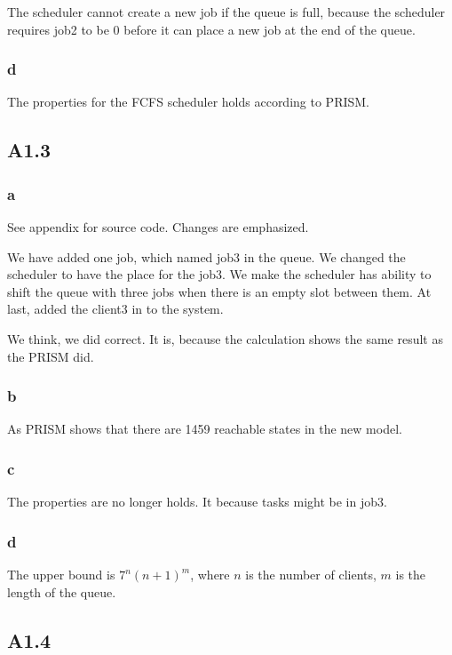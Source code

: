 The scheduler cannot create a new job if the queue is full, because the scheduler
requires job2 to be 0 before it can place a new job at the end of the queue.

\subsubsection{d}

The properties for the FCFS scheduler holds according to PRISM.

\subsection{A1.3}

\subsubsection{a}

See appendix for source code. Changes are emphasized.

We have added one job, which named job3 in the queue.
We changed the scheduler to have the place for the job3. We
make the scheduler has ability to shift the queue with three
jobs when there is an empty slot between them. At last, added
the client3 in to the system.

We think, we did correct. It is, because the calculation shows the
same result as the PRISM did.

\subsubsection{b}

As PRISM shows that there are 1459 reachable states in the
new model.

\subsubsection{c}

The properties are no longer holds. It because tasks might be
in job3.

\subsubsection{d}

The upper bound is $7^n (n + 1)^m$, where $n$ is the number of
clients, $m$ is the length of the queue.

\subsection{A1.4}

